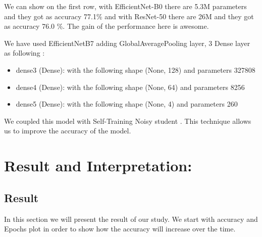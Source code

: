\documentclass[a4paper]{article}
\begin{document}
We can show on the first row, with EfficientNet-B0 there are 5.3M parameters and they got as accuracy 77.1\% and with ResNet-50 there are 26M and they got as accuracy 76.0 \%. The gain of the performance here is awesome.
    
We have used EfficientNetB7 adding GlobalAveragePooling layer, 3 Dense layer as following :
\begin{itemize}
    \item {dense3 (Dense): with the following shape (None, 128) and parameters 327808}
    \item {dense4 (Dense): with the following shape (None, 64) and parameters 8256}
    \item {dense5 (Dense): with the following shape (None, 4) and parameters 260}
\end{itemize}

We coupled this model with Self-Training Noisy student \cite{xie2020selftraining}. This technique allows us to improve the accuracy of the model.


\section{Result and Interpretation:}
\subsection{Result}
In this section we will present the result of our study. We start with accuracy and Epochs plot in order to show how the accuracy will increase over the time.
\end{document}
